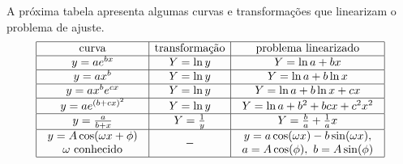 A próxima tabela apresenta algumas curvas e transformações que linearizam o problema de ajuste.
$$
\begin{array}{|c|c|c|}
\hline
\hbox{curva}&\hbox{transformação}&\hbox{problema linearizado}\\
\hline
y=ae^{bx}&Y=\ln y&Y=\ln a+ bx\\
\hline
y=ax^b&Y=\ln y&Y=\ln a+ b\ln x\\
\hline
y=ax^be^{cx}&Y=\ln y&Y=\ln a+ b\ln x+cx\\
\hline
y=ae^{(b+cx)^2}&Y=\ln y&Y=\ln a+b^2+ bc x+c^2x^2\\
\hline
y=\frac{a}{b+x}&Y=\frac{1}{y}&Y=\frac{b}{a}+\frac{1}{a}x\\
\hline
\begin{array}{c}y=A\cos(\omega x+\phi)\\ \omega\ \hbox{conhecido}\end{array}&-&\begin{array}{c}y=a\cos(\omega x)-b\sin(\omega x),\\a=A\cos(\phi),\ b=A\sin(\phi)\end{array}\\
\hline
\end{array}
$$

